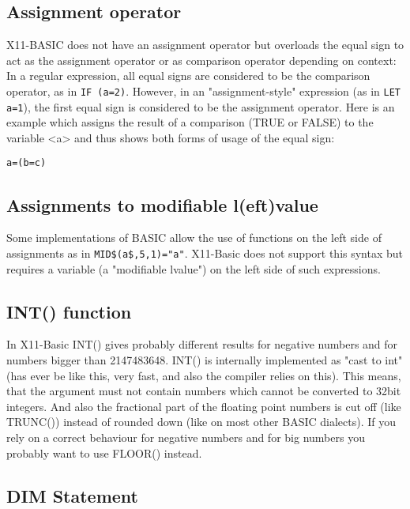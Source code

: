 \subsection*{Assignment operator}

X11-BASIC does not have an assignment operator but overloads the equal sign to
act as the assignment operator or as comparison operator depending on context:
In a regular expression, all equal signs are considered to be the comparison
operator, as in \verb|IF (a=2)|. However, in an "assignment-style" expression
(as in \verb|LET a=1|), the first equal sign is considered to be the assignment
operator. Here is an example which assigns the result of a comparison (TRUE or
FALSE) to the variable <a> and thus shows both forms of usage of the equal sign:

\begin{verbatim}
a=(b=c)
\end{verbatim}


\subsection*{Assignments to modifiable l(eft)value}

Some implementations of BASIC allow the use of functions on the left side of
assignments as in \verb|MID$(a$,5,1)="a"|. X11-Basic does not support this
syntax but requires a variable (a "modifiable lvalue") on the left side of such
expressions.

\subsection*{INT() function}

In X11-Basic INT() gives probably different results for negative numbers and for numbers
bigger than  2147483648. INT() is internally implemented as "cast to int" (has ever be like
this, very fast, and also the compiler relies on this). This means, that the argument must
not contain numbers which cannot be converted to 32bit integers. And also the fractional part
of the floating point numbers is cut off (like TRUNC()) instead of rounded down (like on most
other BASIC dialects). If you rely on a correct behaviour for negative numbers and for big
numbers you probably want to use FLOOR() instead.

\subsection*{DIM Statement}

